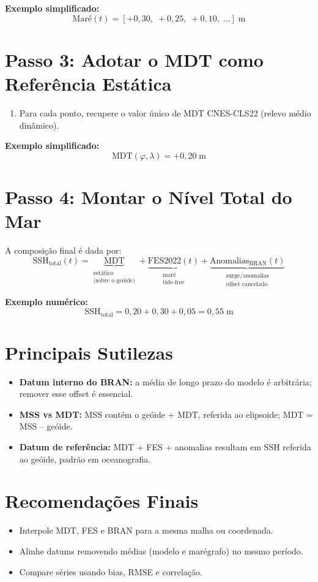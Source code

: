 \documentclass[a4paper,12pt]{article}
\begin{document}
\textbf{Exemplo simplificado:}
\[
\text{Maré}(t) = [ +0{,}30,\; +0{,}25,\; +0{,}10,\;\dots]\;\mathrm{m}
\]

\section{Passo 3: Adotar o MDT como Referência Estática}
\begin{enumerate}
  \item Para cada ponto, recupere o valor único de MDT CNES-CLS22 (relevo médio dinâmico).
\end{enumerate}

\textbf{Exemplo simplificado:}
\[
\text{MDT}(\varphi,\lambda) = +0{,}20\;\mathrm{m}
\]

\section{Passo 4: Montar o Nível Total do Mar}
A composição final é dada por:
\[
\mathrm{SSH}_{\mathrm{total}}(t)
= \underbrace{\mathrm{MDT}}_{\substack{\text{estático}\\\text{(sobre o geóide)}}}
+ \underbrace{\mathrm{FES2022}(t)}_{\substack{\text{maré}\\\text{tide-free}}}
+ \underbrace{\mathrm{Anomalias}_{\mathrm{BRAN}}(t)}_{\substack{\text{surge/anomalias}\\\text{offset cancelado}}}
\]

\textbf{Exemplo numérico:}
\[
\mathrm{SSH}_{\mathrm{total}} = 0{,}20 + 0{,}30 + 0{,}05 = 0{,}55\;\mathrm{m}
\]

\section{Principais Sutilezas}
\begin{itemize}
  \item \textbf{Datum interno do BRAN:} a média de longo prazo do modelo é arbitrária; remover esse offset é essencial.
  \item \textbf{MSS vs MDT:} MSS contém o geóide + MDT, referida ao elipsoide; MDT = MSS -- geóide.
  \item \textbf{Datum de referência:} MDT + FES + anomalias resultam em SSH referida ao geóide, padrão em oceanografia.
\end{itemize}

\section{Recomendações Finais}
\begin{itemize}
  \item Interpole MDT, FES e BRAN para a mesma malha ou coordenada.
  \item Alinhe datums removendo médias (modelo e marégrafo) no mesmo período.
  \item Compare séries usando bias, RMSE e correlação.
\end{itemize}
\end{document}
